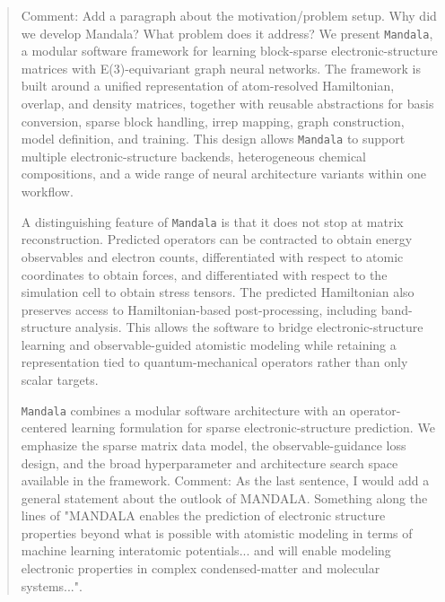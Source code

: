 \begin{abstract}
Comment: Add a paragraph about the motivation/problem setup. Why did we develop Mandala? What problem does it address?
We present \texttt{Mandala}, a modular software framework for learning block-sparse electronic-structure matrices with E(3)-equivariant graph neural networks. The framework is built around a unified representation of atom-resolved Hamiltonian, overlap, and density matrices, together with reusable abstractions for basis conversion, sparse block handling, irrep mapping, graph construction, model definition, and training. This design allows \texttt{Mandala} to support multiple electronic-structure backends, heterogeneous chemical compositions, and a wide range of neural architecture variants within one workflow.

A distinguishing feature of \texttt{Mandala} is that it does not stop at matrix reconstruction. Predicted operators can be contracted to obtain energy observables and electron counts, differentiated with respect to atomic coordinates to obtain forces, and differentiated with respect to the simulation cell to obtain stress tensors. The predicted Hamiltonian also preserves access to Hamiltonian-based post-processing, including band-structure analysis. This allows the software to bridge electronic-structure learning and observable-guided atomistic modeling while retaining a representation tied to quantum-mechanical operators rather than only scalar targets.

\texttt{Mandala} combines a modular software architecture with an operator-centered learning formulation for sparse electronic-structure prediction. We emphasize the sparse matrix data model, the observable-guidance loss design, and the broad hyperparameter and architecture search space available in the framework.
Comment: As the last sentence, I would add a general statement about the outlook of MANDALA. Something along the lines of "MANDALA enables the prediction of electronic structure properties beyond what is possible with atomistic modeling in terms of machine learning interatomic potentials... and will enable modeling electronic properties in complex condensed-matter and molecular systems...".
\end{abstract}
